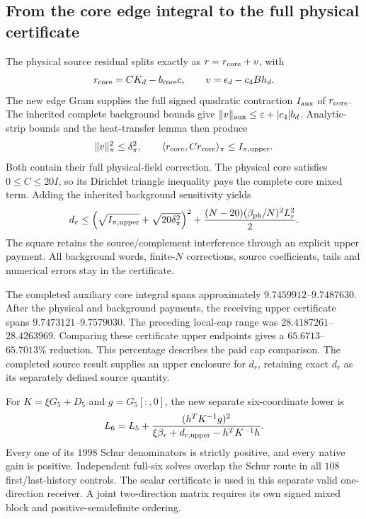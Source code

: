 \subsection{From the core edge integral to the full physical certificate}

The physical source residual splits exactly as $r=r_{\rm core}+v$, with
\[
 r_{\rm core}=CK_d-b_{\rm core}c,\qquad
 v=\epsilon_d-c_4Bh_d.
\]
The new edge Gram supplies the full signed quadratic contraction $I_{\rm aux}$ of $r_{\rm core}$. The inherited complete background bounds give $\|v\|_{\rm aux}\leq\varepsilon+|c_4|b_d$. Analytic-strip bounds and the heat-transfer lemma then produce
\[
 \|v\|_\pi^2\leq\delta_\pi^2,
 \qquad\langle r_{\rm core},Cr_{\rm core}\rangle_\pi
                                  \leq I_{\pi,\rm upper}.
\]
Both contain their full physical-field correction. The physical core satisfies $0\leq C\leq20I$, so its Dirichlet triangle inequality pays the complete core mixed term. Adding the inherited background sensitivity yields
\[
 d_r\leq
 \left(\sqrt{I_{\pi,\rm upper}}+\sqrt{20\delta_\pi^2}\right)^2
 +\frac{(N-20)(\beta_{\rm ph}/N)^2L_r^2}{2}.
\]
The square retains the source/complement interference through an explicit upper payment. All background words, finite-$N$ corrections, source coefficients, tails and numerical errors stay in the certificate. 

The completed auxiliary core integral spans approximately $9.7459912$--$9.7487630$. After the physical and background payments, the receiving upper certificate spans $9.7473121$--$9.7579030$. The preceding local-cap range was $28.4187261$--$28.4263969$. Comparing these certificate upper endpoints gives a $65.6713$--$65.7013\%$ reduction. This percentage describes the paid cap comparison. The completed source result supplies an upper enclosure for $d_r$, retaining exact $d_r$ as its separately defined source quantity. 

For $K=\xi G_5+D_5$ and $g=G_5[:,0]$, the new separate six-coordinate lower is
\[
 L_6=L_5+
 \frac{(h^TK^{-1}g)^2}
 {\xi\beta_r+d_{r,\rm upper}-h^TK^{-1}h}.
\]
Every one of its $1998$ Schur denominators is strictly positive, and every native gain is positive. Independent full-six solves overlap the Schur route in all $108$ first/last-history controls. The scalar certificate is used in this separate valid one-direction receiver. A joint two-direction matrix requires its own signed mixed block and positive-semidefinite ordering.

